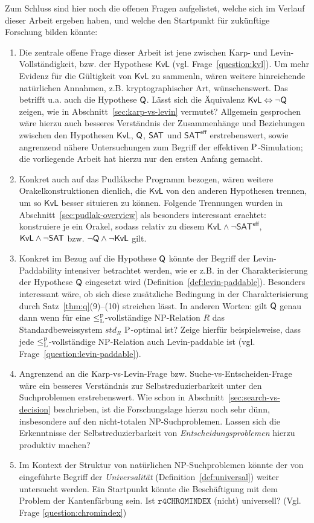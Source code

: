 Zum Schluss sind hier noch die offenen Fragen aufgelistet, welche sich im Verlauf dieser Arbeit ergeben haben, und welche den Startpunkt für zukünftige Forschung bilden könnte:
\begin{enumerate}[label=\arabic*.,midpenalty=0]
    \item Die zentrale offene Frage dieser Arbeit ist jene zwischen Karp- und Levin-Vollständigkeit, bzw. der Hypothese $\mathsf{KvL}$ (vgl. Frage~\ref{question:kvl}). Um mehr Evidenz für die Gültigkeit von $\mathsf{KvL}$ zu sammenln, wären weitere hinreichende natürlichen Annahmen, z.B. kryptographischer Art, wünschenswert.
        Das betrifft u.a. auch die Hypothese $\hQ$. Lässt sich die Äquivalenz $\mathsf{KvL}\Leftrightarrow \neg\hQ$ zeigen, wie in Abschnitt~\ref{sec:karp-vs-levin} vermutet?
        Allgemein gesprochen wäre hierzu auch besseres Verständnis der Zusammenhänge und Beziehungen zwischen den Hypothesen $\mathsf{KvL}$, $\hQ$, $\hSAT$ und $\mathsf{SAT^{eff}}$ erstrebenswert, sowie angrenzend nähere Untersuchungen zum Begriff der effektiven $\P$-Simulation; die vorliegende Arbeit hat hierzu nur den ersten Anfang gemacht.

    \item Konkret auch auf das Pudláksche Programm bezogen, wären weitere Orakelkonstruktionen dienlich, die $\mathsf{KvL}$ von den anderen Hypothesen trennen, um so $\mathsf{KvL}$ besser situieren zu können. Folgende Trennungen wurden in Abschnitt~\ref{sec:pudlak-overview} als besonders interessant erachtet: konstruiere je ein Orakel, sodass relativ zu diesem $\mathsf{KvL}\land\neg\mathsf{SAT^{eff}}$, $\mathsf{KvL}\land\neg\hSAT$ bzw. $\neg\hQ\land\neg\mathsf{KvL}$ gilt.
    \item Konkret im Bezug auf die Hypothese $\hQ$ könnte der Begriff der Levin-Paddability intensiver betrachtet werden, wie er z.B. in der Charakterisierung der Hypothese $\hQ$ eingesetzt wird (Definition~\ref{def:levin-paddable}). Besonders interessant wäre, ob sich diese zusätzliche Bedingung in der Charakterisierung durch Satz~\ref{thm:q}(9)–(10) streichen lässt. In anderen Worten: gilt $\hQ$ genau dann wenn für eine $\leqlp$-vollständige NP-Relation $R$ das Standardbeweissystem $\mathit{std}_R$ $\P$-optimal ist?
        Zeige hierfür beispielsweise, dass jede $\leqlp$-vollständige NP-Relation auch Levin-paddable ist (vgl. Frage~\ref{question:levin-paddable}).
    \item Angrenzend an die Karp-vs-Levin-Frage bzw. Suche-vs-Entscheiden-Frage wäre ein besseres Verständnis zur Selbstreduzierbarkeit unter den Suchproblemen erstrebenswert. Wie schon in Abschnitt~\ref{sec:search-vs-decision} beschrieben, ist die Forschungslage hierzu noch sehr dünn, insbesondere auf den nicht-totalen NP-Suchproblemen. Lassen sich die Erkenntnisse der Selbstreduzierbarkeit von \emph{Entscheidungsproblemen} hierzu produktiv machen?
\item Im Kontext der Struktur von natürlichen NP-Suchproblemen könnte der von \textcite{agrawal_universal_1992} eingeführte Begriff der \emph{Universalität} (Definition~\ref{def:universal}) weiter untersucht werden. Ein Startpunkt könnte die Beschäftigung mit dem Problem der Kantenfärbung sein. Ist $\mathtt{r4CHROMINDEX}$ (nicht) universell? (Vgl. Frage \ref{question:chromindex})
\end{enumerate}
